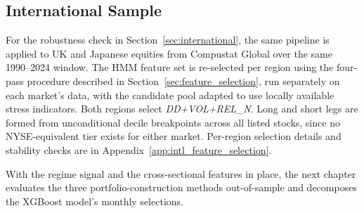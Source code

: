 \subsection{International Sample}\label{sec:intl_sample}

For the robustness check in Section~\ref{sec:international}, the same pipeline is applied to UK and Japanese equities from Compustat Global over the same 1990--2024 window. The HMM feature set is re-selected per region using the four-pass procedure described in Section~\ref{sec:feature_selection}, run separately on each market's data, with the candidate pool adapted to use locally available stress indicators. Both regions select \emph{DD+VOL+REL\_N}. Long and short legs are formed from unconditional decile breakpoints across all listed stocks, since no NYSE-equivalent tier exists for either market. Per-region selection details and stability checks are in Appendix~\ref{app:intl_feature_selection}.

With the regime signal and the cross-sectional features in place, the next chapter evaluates the three portfolio-construction methods out-of-sample and decomposes the XGBoost model's monthly selections.
